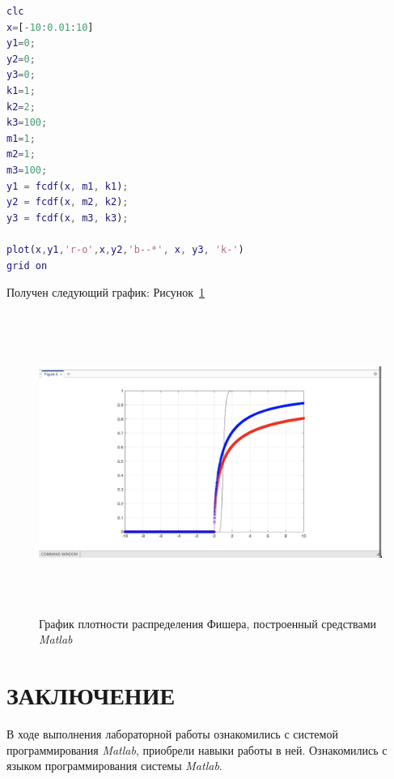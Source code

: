 \documentclass[a4paper,hidelinks,14pt]{extarticle}
\begin{document}
\begin{minipage}{\linewidth}
    \begin{lstlisting}[language=matlab,caption=Код программы \textit{Matlab}, label={lst:listing3}]
clc
x=[-10:0.01:10]
y1=0;
y2=0;
y3=0;
k1=1;
k2=2;
k3=100;
m1=1;
m2=1;
m3=100;
y1 = fcdf(x, m1, k1);
y2 = fcdf(x, m2, k2);
y3 = fcdf(x, m3, k3);

plot(x,y1,'r-o',x,y2,'b--*', x, y3, 'k-')
grid on
\end{lstlisting}
\end{minipage}

Получен следующий график: Рисунок~\ref{fig:fig5}
\begin{figure}[!htbp]
    \centering
    \includegraphics[width=150mm,height=98mm]{fig/raspr_plotn.png}
    \caption{График плотности распределения Фишера, построенный средствами \textit{Matlab}}
    \label{fig:fig5}
\end{figure}


\section*{ЗАКЛЮЧЕНИЕ}

В ходе выполнения лабораторной работы ознакомились с системой  программирования \textit{Matlab}, приобрели навыки работы в ней. Ознакомились с языком программирования системы \textit{Matlab}.


\newpage


\end{document}

